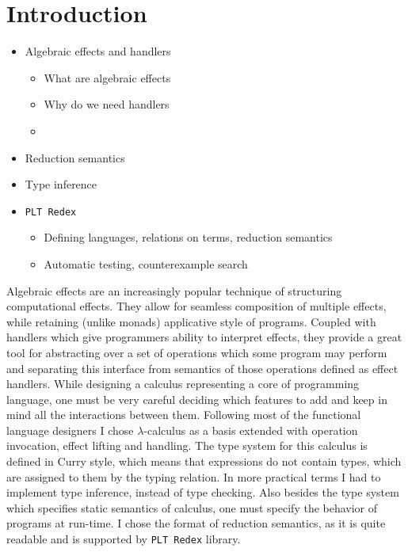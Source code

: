 \documentclass[inz, english, shortabstract]{iithesis}
\author         {Maciej Buszka}
\newcommand{\Redex}{\texttt{PLT Redex} }
\newcommand{\LC}{\(\lambda\)-calculus }
\begin{document}

\chapter{Introduction}
\begin{itemize}
  \item Algebraic effects and handlers
  \begin{itemize}
    \item What are algebraic effects
    \item Why do we need handlers
    \item 
  \end{itemize}
  
  \item Reduction semantics
  
  \item Type inference
  
  \item \Redex
  \begin{itemize}
    \item Defining languages, relations on terms, reduction semantics
    \item Automatic testing, counterexample search
  \end{itemize}
\end{itemize}

Algebraic effects \cite{Plotkin2003} are an increasingly popular technique of structuring computational effects.
They allow for seamless composition of multiple effects, while retaining (unlike monads) applicative style of programs.
Coupled with handlers \cite{Plotkin2013} which give programmers ability to interpret effects, they provide a great tool for abstracting over a set of operations which some program may perform and separating this interface from semantics of those operations defined as effect handlers.
While designing a calculus representing a core of programming language, one must be very careful deciding which features to add and keep in mind all the interactions between them.
Following most of the functional language designers I chose \LC as a basis extended with operation invocation, effect lifting and handling.
The type system for this calculus is defined in Curry style, which means that expressions do not contain types, which are assigned to them by the typing relation.
In more practical terms I had to implement type inference, instead of type checking.
Also besides the type system which specifies static semantics of calculus, one must specify the behavior of programs at run-time.
I chose the format of reduction semantics, as it is quite readable and is supported by \Redex library.
\end{document}
